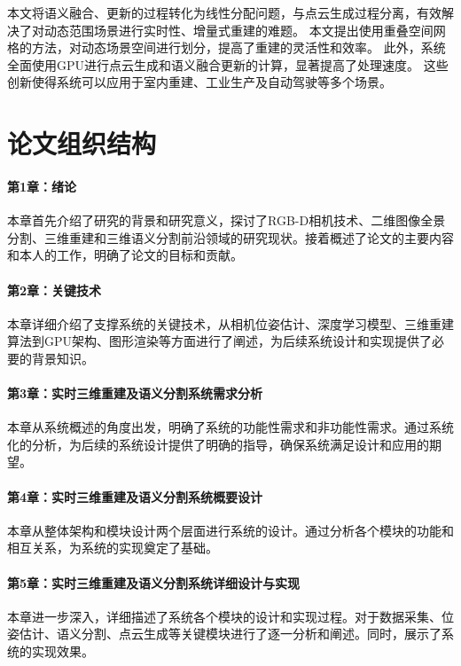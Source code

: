 \par 本文将语义融合、更新的过程转化为线性分配问题，与点云生成过程分离，有效解决了对动态范围场景进行实时性、增量式重建的难题。
本文提出使用重叠空间网格的方法，对动态场景空间进行划分，提高了重建的灵活性和效率。
此外，系统全面使用GPU进行点云生成和语义融合更新的计算，显著提高了处理速度。
这些创新使得系统可以应用于室内重建、工业生产及自动驾驶等多个场景。

\section{论文组织结构}
\paragraph{第1章：绪论}
\par 本章首先介绍了研究的背景和研究意义，探讨了RGB-D相机技术、二维图像全景分割、三维重建和三维语义分割前沿领域的研究现状。接着概述了论文的主要内容和本人的工作，明确了论文的目标和贡献。

\paragraph{第2章：关键技术}
\par 本章详细介绍了支撑系统的关键技术，从相机位姿估计、深度学习模型、三维重建算法到GPU架构、图形渲染等方面进行了阐述，为后续系统设计和实现提供了必要的背景知识。

\paragraph{第3章：实时三维重建及语义分割系统需求分析}
\par 本章从系统概述的角度出发，明确了系统的功能性需求和非功能性需求。通过系统化的分析，为后续的系统设计提供了明确的指导，确保系统满足设计和应用的期望。

\paragraph{第4章：实时三维重建及语义分割系统概要设计}
\par 本章从整体架构和模块设计两个层面进行系统的设计。通过分析各个模块的功能和相互关系，为系统的实现奠定了基础。

\paragraph{第5章：实时三维重建及语义分割系统详细设计与实现}
\par 本章进一步深入，详细描述了系统各个模块的设计和实现过程。对于数据采集、位姿估计、语义分割、点云生成等关键模块进行了逐一分析和阐述。同时，展示了系统的实现效果。

